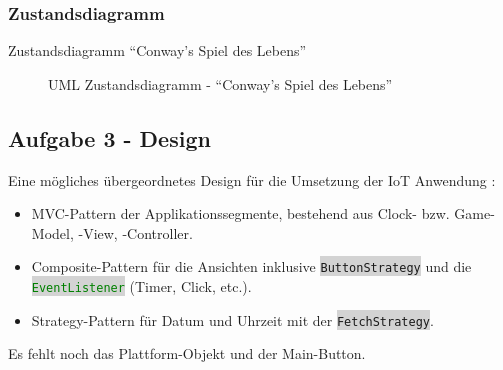 \documentclass[11pt,ngerman]{article}
\newcommand{\inlinecode}[2]{\colorbox{lightgray}{\lstinline[language=#1]$#2$}}
\newcommand{\quotes}[1]{``#1''}
\begin{document}
    \subsubsection{Zustandsdiagramm}
    \label{sssec:Zustandsdiagramm}
    Zustandsdiagramm \quotes{Conway's Spiel des Lebens}
    \begin{figure}[H]
        \centering
        \caption{UML Zustandsdiagramm - \quotes{Conway's Spiel des Lebens}}
        \label{fig:ZD_Aufg2}
    \end{figure}

    \newpage
    \subsection{Aufgabe 3 - Design}
    \label{ssec:Aufg3}
    Eine mögliches übergeordnetes Design für die Umsetzung der  IoT Anwendung :
    \begin{itemize}
        \item  MVC-Pattern der Applikationssegmente, bestehend aus Clock- bzw. Game-Model, -View, -Controller.
        \item Composite-Pattern für die Ansichten inklusive \inlinecode{Java}{ButtonStrategy} und die \inlinecode{Java}{EventListener} (Timer, Click, etc.).
        \item Strategy-Pattern für Datum und Uhrzeit mit der \inlinecode{Java}{FetchStrategy}.
    \end{itemize}
    Es fehlt noch das Plattform-Objekt und der Main-Button.
\end{document}
